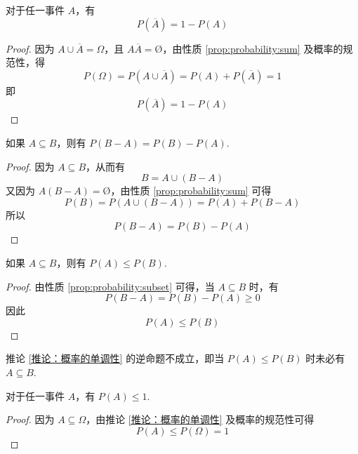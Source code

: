 \begin{property}
    \indent 对于任一事件 $A$，有
    \begin{equation}
        P(\overline{A})=1-P(A)
    \end{equation}
\end{property}

\begin{proof}
    因为 $A \cup \overline{A} = \varOmega$，且 $A \overline{A} = \text{\O}$，由性质 \ref{prop:probability:sum} 及概率的规范性，得
    $$
    P(\varOmega) = P(A \cup \overline{A}) = P(A) + P(\overline{A}) = 1
    $$
    即
    \[
    P(\overline{A})=1-P(A)
    \]
\end{proof}

\begin{property}
    \indent 如果 $A \subseteq B$，则有 $P(B-A)=P(B)-P(A)$.
\end{property}

\begin{proof}
    因为 $A \subseteq B$，从而有
    $$
    B = A \cup (B-A)
    $$
    又因为 $A(B-A)=\text{\O}$，由性质 \ref{prop:probability:sum} 可得
    $$
    P(B) = P(A \cup (B-A)) = P(A) + P(B-A)
    $$
    所以
    $$
    P(B-A)=P(B)-P(A)
    $$
\end{proof}

\begin{corollary}[][概率的单调性][推论：概率的单调性]
    \indent 如果 $A \subseteq B$，则有 $P(A) \leqslant P(B)$.
\end{corollary}

\begin{proof}
    由性质 \ref{prop:probability:subset} 可得，当 $A \subseteq B$ 时，有
    $$
    P(B-A) = P(B)-P(A) \geqslant 0
    $$
    因此
    $$
    P(A) \leqslant P(B)
    $$
\end{proof}

\begin{note}
    \indent 推论 \ref{推论：概率的单调性} 的逆命题不成立，即当 $P(A) \leqslant P(B)$ 时未必有 $A \subseteq B$.
\end{note}

\begin{property}[][][prop:probability:<=1]
    \indent 对于任一事件 $A$，有 $P(A) \leqslant 1$.
\end{property}

\begin{proof}
    因为 $A \subseteq \varOmega$，由推论 \ref{推论：概率的单调性} 及概率的规范性可得
    \[
    P(A) \leqslant P(\varOmega) = 1
    \]
\end{proof}

